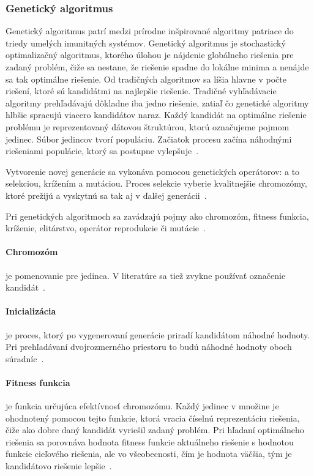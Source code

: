 \documentclass[a4paper,slovak,12pt,appendix]{article}
\begin{document}
\subsubsection{Genetický algoritmus}
Genetický algoritmus patrí medzi prírodne inšpirované algoritmy patriace do
triedy umelých imunitných systémov. Genetický algoritmus je stochastický
optimalizačný algoritmus, ktorého úlohou je nájdenie globálneho riešenia pre
zadaný problém, čiže sa nestane, že riešenie spadne do lokálne minima a nenájde
sa tak optimálne riešenie. Od tradičných algoritmov sa líšia hlavne v počte
riešení, ktoré sú kandidátmi na najlepšie riešenie. Tradičné vyhľadávacie
algoritmy prehľadávajú dôkladne iba jedno riešenie, zatiaľ čo genetické
algoritmy hlbšie spracujú viacero kandidátov naraz. Každý kandidát na optimálne
riešenie problému je reprezentovaný dátovou štruktúrou, ktorú označujeme pojmom
jedinec. Súbor jedincov tvorí populáciu. Začiatok procesu začína náhodnými
riešeniami populácie, ktorý sa postupne vylepšuje~\cite{Chavan2015}.

Vytvorenie novej generácie sa vykonáva pomocou genetických operátorov:
a to selekciou, krížením a mutáciou. Proces selekcie vyberie kvalitnejšie
chromozómy, ktoré prežijú a vyskytnú sa tak aj v ďalšej
generácii~\cite{Simonova2007}.

Pri genetických algoritmoch sa zavádzajú pojmy ako chromozóm, fitness funkcia,
kríženie, elitárstvo, operátor reprodukcie či mutácie~\cite{Chavan2015}.

\paragraph{Chromozóm} je pomenovanie pre jedinca. V literatúre sa tiež zvykne
používať označenie kandidát~\cite{Arun2016}.

\paragraph{Inicializácia} je proces, ktorý po vygenerovaní generácie priradí
kandidátom náhodné hodnoty. Pri prehľadávaní dvojrozmerného priestoru to budú
náhodné hodnoty oboch súradníc~\cite{Lazinica2009}.

\paragraph{Fitness funkcia} je funkcia určujúca efektívnosť chromozómu. Každý
jedinec v množine je ohodnotený pomocou tejto funkcie, ktorá vracia číselnú
reprezentáciu riešenia, čiže ako dobre daný kandidát vyriešil zadaný problém.
Pri hľadaní optimálneho riešenia sa porovnáva hodnota fitness funkcie aktuálneho
riešenie s hodnotou funkcie cieľového riešenia, ale vo všeobecnosti, čím je
hodnota väčšia, tým je kandidátovo riešenie
lepšie~\cite{Chavan2015, Lazinica2009, Simonova2007}.
\end{document}
